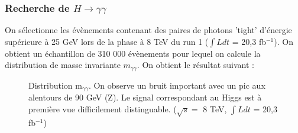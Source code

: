 \documentclass[11pt]{article} %
\begin{document}
\subsubsection{Recherche de $H \to \gamma\gamma$}

On sélectionne les évènements contenant des paires de photons 'tight' d'énergie supérieure à 25 GeV lors de la phase à 8 TeV du run 1 ($\int L dt$ = 20,3 fb$^{-1}$).
On obtient un échantillon de 310 000 évènements pour lequel on calcule la distribution de masse invariante $m_{\gamma \gamma}$. On obtient le résultat suivant :

\begin{figure}[H]
\centering
  \caption{Distribution m$_{\gamma \gamma}$. On observe un bruit important avec un pic aux alentours de 90 GeV (Z). Le signal correspondant au Higgs est à première vue difficilement distinguable. ($\sqrt{s} =$ 8 TeV,  $\int L dt$ = 20,3 fb$^{-1}$) }
 \resizebox{.8\linewidth}{!}{}
\end{figure}

%
%
%
%
%
%
%
\end{document}
